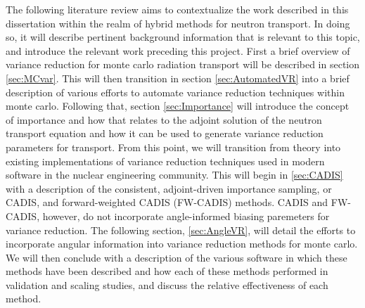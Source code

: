 The following literature review aims to contextualize the work described in this dissertation within the realm of hybrid methods for neutron transport. In doing so, it will describe pertinent background information that is relevant to this topic, and introduce the relevant work preceding this project. 
First a brief overview of variance reduction for monte carlo radiation transport will be described in section \ref{sec:MCvar}.
This will then transition in section \ref{sec:AutomatedVR} into a brief description of various efforts to automate variance reduction techniques within monte carlo. 
Following that, section \ref{sec:Importance} will introduce the concept of importance and how that relates to the adjoint solution of the neutron transport equation and how it can be used to generate variance reduction parameters for transport.
From this point, we will transition from theory into existing implementations of variance reduction techniques used in modern software in the nuclear engineering community. This will begin in \ref{sec:CADIS} with a description of the consistent, adjoint-driven importance sampling, or CADIS, and forward-weighted CADIS (FW-CADIS) methods.
CADIS and FW-CADIS, however, do not incorporate angle-informed biasing paremeters for variance reduction. 
The following section, \ref{sec:AngleVR}, will detail the efforts to incorporate angular information into variance reduction methods for monte carlo. 
We will then conclude 
with a description of the various software in which these methods have been described and how each of these methods performed in validation and scaling studies, and discuss the relative effectiveness of each method. 